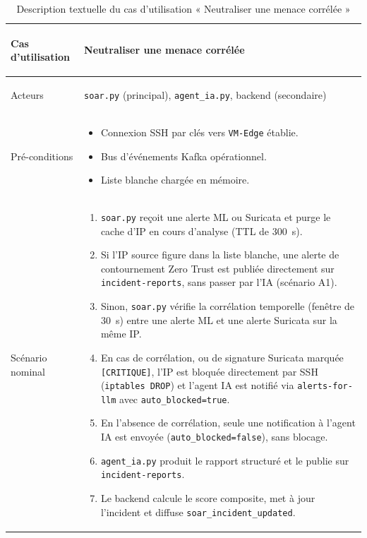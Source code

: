 \renewcommand{\arraystretch}{1.25}
\small
\begin{xltabular}{\textwidth}{|>{\bfseries\raggedright\arraybackslash}p{3.2cm}|>{\raggedright\arraybackslash}X|}

\caption{Description textuelle du cas d'utilisation « Neutraliser une menace corrélée »}
\label{tab:uc-s6} \\

\hline
\endfirsthead
\hline
\endhead

Cas d'utilisation & Neutraliser une menace corrélée \\ \hline
Acteurs & \texttt{soar.py} (principal), \texttt{agent\_ia.py}, backend (secondaire) \\ \hline
Pré-conditions & 
\begin{itemize}[nosep,leftmargin=*]
\item Connexion SSH par clés vers \texttt{VM-Edge} établie.
\item Bus d'événements Kafka opérationnel.
\item Liste blanche chargée en mémoire.
\end{itemize} \\ \hline
Scénario nominal &
\begin{enumerate}[nosep,leftmargin=*]
\item \texttt{soar.py} reçoit une alerte ML ou Suricata et purge le cache d'IP en cours d'analyse (\ac{TTL} de 300~s).
\item Si l'IP source figure dans la liste blanche, une alerte de contournement Zero Trust est publiée directement sur \texttt{incident-reports}, sans passer par l'IA (scénario A1).
\item Sinon, \texttt{soar.py} vérifie la corrélation temporelle (fenêtre de 30~s) entre une alerte ML et une alerte Suricata sur la même IP.
\item En cas de corrélation, ou de signature Suricata marquée \texttt{[CRITIQUE]}, l'IP est bloquée directement par SSH (\texttt{iptables DROP}) et l'agent IA est notifié via \texttt{alerts-for-llm} avec \texttt{auto\_blocked=true}.
\item En l'absence de corrélation, seule une notification à l'agent IA est envoyée (\texttt{auto\_blocked=false}), sans blocage.
\item \texttt{agent\_ia.py} produit le rapport structuré et le publie sur \texttt{incident-reports}.
\item Le backend calcule le score composite, met à jour l'incident et diffuse \texttt{soar\_incident\_updated}.
\end{enumerate} \\ \hline

\end{xltabular}
